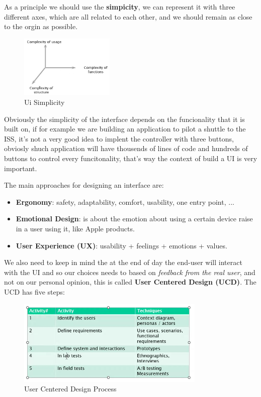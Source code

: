 \documentclass[12pt]{article}
\begin{document}
As a principle we should use the \textbf{simpicity}, we can represent it with three different axes, which are all related to each other, and we should remain as close to the orgin as possible.
\begin{figure}[H]
  \centering
  \includegraphics[width=0.4\textwidth]{ui-simplicity.png}
  \caption{Ui Simplicity}
  \label{fig:ui-simplicity}
\end{figure}
Obviously the simplicity of the interface depends on the funcionality that it is built on, if for example we are building an application to pilot a shuttle to the ISS, it's not a very good idea to implent the controller with three buttons, obviosly shuch application will have thousends of lines of code and hundreds of buttons to control every funcitonality, that's way the context of build a UI is very important.

\hfill

The main approaches for designing an interface are:
\begin{itemize}
  \item \textbf{Ergonomy}: safety, adaptability, comfort, usability, one entry point, ...
  \item \textbf{Emotional Design}: is about the emotion about using a certain device raise in a user using it, like Apple products.
  \item \textbf{User Experience (UX)}: usability + feelings + emotions + values.
\end{itemize}
We also need to keep in mind the at the end of day the end-user will interact with the UI and so our choices needs to based on \emph{feedback from the real user}, and not on our personal opinion, this is called \textbf{User Centered Design (UCD)}. The UCD has five steps:
\begin{figure}[H]
  \centering
  \includegraphics[width=0.8\textwidth]{user-centered-design-process.png}
  \caption{User Centered Design Process}
  \label{fig:user-centered-design-process}
\end{figure}
\end{document}
